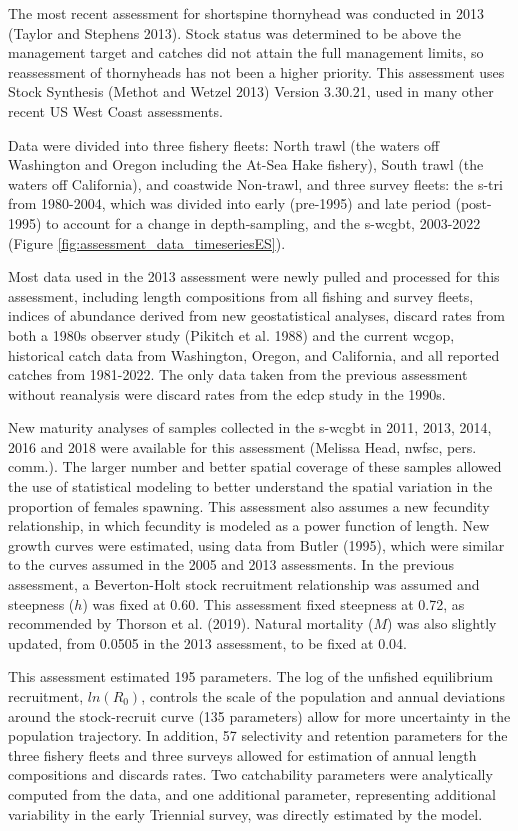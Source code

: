 \documentclass[11pt,
  english,
  letterpaper,
]{article}
\begin{document}
The most recent assessment for shortspine thornyhead was conducted in 2013 (Taylor and Stephens 2013). Stock status was determined to be above the management target and catches did not attain the full management limits, so reassessment of thornyheads has not been a higher priority. This assessment uses Stock Synthesis (Methot and Wetzel 2013) Version 3.30.21, used in many other recent US West Coast assessments.

Data were divided into three fishery fleets: North trawl (the waters off Washington and Oregon including the At-Sea Hake fishery), South trawl (the waters off California), and coastwide Non-trawl, and three survey fleets: the \gls{s-tri} from 1980-2004, which was divided into early (pre-1995) and late period (post-1995) to account for a change in depth-sampling, and the \gls{s-wcgbt}, 2003-2022 (Figure \ref{fig:assessment_data_timeseriesES}).

Most data used in the 2013 assessment were newly pulled and processed for this assessment, including length compositions from all fishing and survey fleets, indices of abundance derived from new geostatistical analyses, discard rates from both a 1980s observer study (Pikitch et al. 1988) and the current \gls{wcgop}, historical catch data from Washington, Oregon, and California, and all reported catches from 1981-2022. The only data taken from the previous assessment without reanalysis were discard rates from the \gls{edcp} study in the 1990s.

New maturity analyses of samples collected in the \gls{s-wcgbt} in 2011, 2013, 2014, 2016 and 2018 were available for this assessment (Melissa Head, \gls{nwfsc}, pers. comm.). The larger number and better spatial coverage of these samples allowed the use of statistical modeling to better understand the spatial variation in the proportion of females spawning. This assessment also assumes a new fecundity relationship, in which fecundity is modeled as a power function of length. New growth curves were estimated, using data from Butler (1995), which were similar to the curves assumed in the 2005 and 2013 assessments. In the previous assessment, a Beverton-Holt stock recruitment relationship was assumed and steepness (\(h\)) was fixed at 0.60. This assessment fixed steepness at 0.72, as recommended by Thorson et al. (2019). Natural mortality (\(M\)) was also slightly updated, from 0.0505 in the 2013 assessment, to be fixed at 0.04.

This assessment estimated 195 parameters. The log of the unfished equilibrium recruitment, \(ln(R_0)\), controls the scale of the population and annual deviations around the stock-recruit curve (135 parameters) allow for more uncertainty in the population trajectory. In addition, 57 selectivity and retention parameters for the three fishery fleets and three surveys allowed for estimation of annual length compositions and discards rates. Two catchability parameters were analytically computed from the data, and one additional parameter, representing additional variability in the early Triennial survey, was directly estimated by the model.
\end{document}
